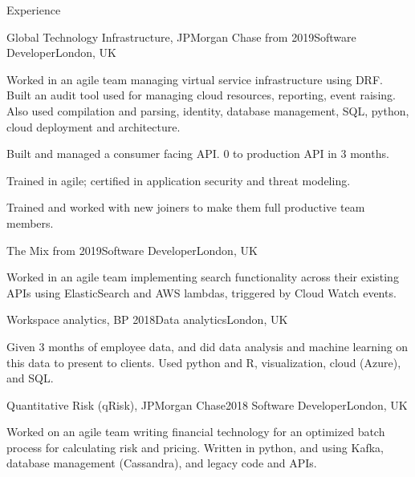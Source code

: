 \documentclass[10pt]{resume} %
\begin{document}
\begin{rSection}{Experience}


  \begin{rSubsection}{Global Technology Infrastructure, JPMorgan Chase}
    {from 2019}{Software Developer}{London, UK}
  \item Worked in an agile team managing virtual service infrastructure using
    DRF. Built an audit tool used for managing cloud resources, reporting, event
    raising. Also used compilation and parsing, identity, database management,
    SQL, python, cloud deployment and architecture.
  \item Built and managed a consumer facing API. 0 to production API in 3 months.
  \item Trained in agile; certified in application security and threat modeling.
  \item Trained and worked with new joiners to make them full productive team
    members.
  \end{rSubsection}


  \begin{rSubsection}{The Mix}
    {from 2019}{Software Developer}{London, UK}
  \item Worked in an agile team implementing search functionality across their
    existing APIs using ElasticSearch and AWS lambdas, triggered by Cloud Watch
    events.
  \end{rSubsection}


  \begin{rSubsection}{Workspace analytics, BP}
    {2018}{Data analytics}{London, UK}
  \item Given 3 months of employee data, and did data analysis and machine
    learning on this data to present to clients. Used python and R,
    visualization, cloud (Azure), and SQL.
  \end{rSubsection}


  \begin{rSubsection}{Quantitative Risk (qRisk), JPMorgan Chase}{2018}
    {Software Developer}{London, UK}
    \item Worked on an agile team writing financial technology for an optimized
      batch process for calculating risk and pricing. Written in python, and
      using Kafka, database management (Cassandra), and legacy code and APIs.
  \end{rSubsection}


\end{rSection}
\end{document}
